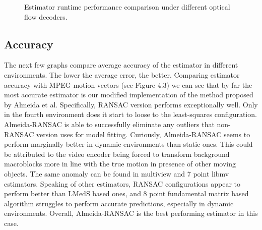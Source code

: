 \documentclass[11pt,english]{report}
\newcommand{\getstat}[1]{docs/statistics/#1}
\newcommand{\statplot}[4]{
	\addplot[#3, mark = #4, thick, smooth, mark size = 2, mark options={fill=#3}] table [y=#2, col sep=comma] {\getstat{#1}};
}
\begin{document}
\begin{figure}[!ht]
\begin{center}
\end{center}
\caption{\centering Estimator runtime performance comparison under different optical flow decoders.}
\end{figure}

\subsection{Accuracy}

The next few graphs compare average accuracy of the estimator in different environments. The lower the average error, the better. Comparing estimator accuracy with MPEG motion vectors (see Figure 4.3) we can see that by far the most accurate estimator is our modified implementation of the method proposed by Almeida et al. Specifically, RANSAC version performs exceptionally well. Only in the fourth environment does it start to loose to the least-squares configuration. Almeida-RANSAC is able to successfully eliminate any outliers that non-RANSAC version uses for model fitting. Curiously, Almeida-RANSAC seems to perform marginally better in dynamic environments than static ones. This could be attributed to the video encoder being forced to transform background macroblocks more in line with the true motion in presence of other moving objects. The same anomaly can be found in multiview and 7 point libmv estimators. Speaking of other estimators, RANSAC configurations appear to perform better than LMedS based ones, and 8 point fundamental matrix based algorithm struggles to perform accurate predictions, especially in dynamic environments. Overall, Almeida-RANSAC is the best performing estimator in this case.
\end{document}

